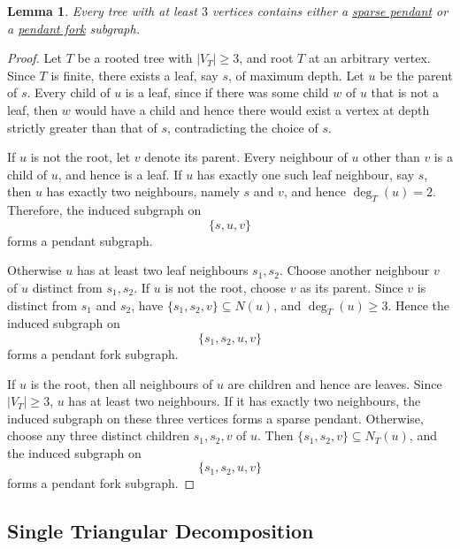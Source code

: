 \documentclass[11pt]{article}
\newtheorem{lemma}{Lemma}
\begin{document}
\begin{lemma} \label{lemma::tree_pendant_pendant_fork}
  Every tree with at least $3$ vertices contains either a \hyperref[def::sparse_pendant]{sparse pendant} or a \hyperref[def::pendant_fork]{pendant fork} subgraph.
\end{lemma}
\begin{proof} 
  Let $T$ be a rooted tree with $|V_T| \ge 3$, and root $T$ at an arbitrary vertex. Since $T$ is finite, there exists a leaf, say $s$, of maximum depth. Let $u$ be the parent of $s$. Every child of $u$ is a leaf, since if there was some child $w$ of $u$ that is not a leaf, then $w$ would have a child and hence there would exist a vertex at depth strictly greater than that of $s$, contradicting the choice of $s$.

  If $u$ is not the root, let $v$ denote its parent. Every neighbour of $u$ other than $v$ is a child of $u$, and hence is a leaf. If $u$ has exactly one such leaf neighbour, say $s$, then $u$ has exactly two neighbours, namely $s$ and $v$, and hence $\deg_T(u)=2$. Therefore, the induced subgraph on
  \[
  \{s,u,v\}
  \]
  forms a pendant subgraph.

  Otherwise $u$ has at least two leaf neighbours $s_1,s_2$. Choose another neighbour $v$ of $u$ distinct from $s_1,s_2$. If $u$ is not the root, choose $v$ as its parent. Since $v$ is distinct from $s_1$ and $s_2$, have $\{s_1,s_2,v\}\subseteq N(u)$, and $\deg_T(u)\ge3$. Hence the induced subgraph on
  \[
  \{s_1,s_2,u,v\}
  \]
  forms a pendant fork subgraph.

  If $u$ is the root, then all neighbours of $u$ are children and hence are leaves. Since $|V_T| \ge 3$, $u$ has at least two neighbours. If it has exactly two neighbours, the induced subgraph on these three vertices forms a sparse pendant. Otherwise, choose any three distinct children $s_1,s_2,v$ of $u$. Then $\{s_1,s_2,v\}\subseteq N_T(u)$, and the induced subgraph on
  \[
    \{s_1,s_2,u,v\}
  \]
  forms a pendant fork subgraph.
\end{proof}



\subsection{Single Triangular Decomposition} \label{subsec::single_triangular_decomposition}
\end{document}
